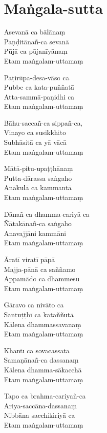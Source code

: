 
\clearpage

\chapter{Maṅgala-sutta}%


\begin{paritta}
Asevanā ca bālānaṃ\\
Paṇḍitānañ-ca sevanā\\
Pūjā ca pūjanīyānaṃ\\
Etam maṅgalam-uttamaṃ

Paṭirūpa-desa-vāso ca\\
Pubbe ca kata-puññatā\\
Atta-sammā-paṇidhi ca\\
Etam maṅgalam-uttamaṃ

Bāhu-saccañ-ca sippañ-ca,\\
Vinayo ca susikkhito\\
Subhāsitā ca yā vācā\\
Etam maṅgalam-uttamaṃ

Mātā-pitu-upaṭṭhānaṃ\\
Putta-dārassa saṅgaho\\
Anākulā ca kammantā\\
Etam maṅgalam-uttamaṃ

Dānañ-ca dhamma-cariyā ca\\
Ñātakānañ-ca saṅgaho\\
Anavajjāni kammāni\\
Etam maṅgalam-uttamaṃ

Āratī viratī pāpā\\
Majja-pānā ca saññamo\\
Appamādo ca dhammesu\\
Etam maṅgalam-uttamaṃ

Gāravo ca nivāto ca\\
Santuṭṭhī ca kataññutā\\
Kālena dhammassavanaṃ\\
Etam maṅgalam-uttamaṃ

Khantī ca sovacassatā\\
Samaṇānañ-ca dassanaṃ\\
Kālena dhamma-sākacchā\\
Etam maṅgalam-uttamaṃ

Tapo ca brahma-cariyañ-ca\\
Ariya-saccāna-dassanaṃ\\
Nibbāna-sacchikiriyā ca\\
Etam maṅgalam-uttamaṃ


\end{paritta}
